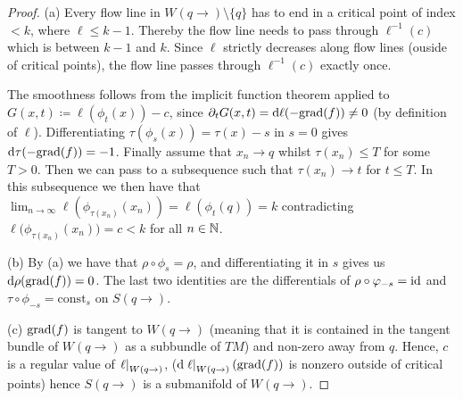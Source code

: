 \begin{proof}
(a) Every flow line in $W(q\to)\setminus \{q\}$ has to end in a critical point of index $<k$, where $\ell\leq k-1$. Thereby the flow line needs to pass through $\ell^{-1}(c)$ which is between $k-1$ and $k$. Since $\ell$ strictly decreases along flow lines (ouside of critical points), the flow line passes through $\ell^{-1}(c)$ exactly once.
 
The smoothness follows from the implicit function theorem applied to $G(x,t)\coloneq \ell(\phi_t(x))-c$, since $\partial_t G(x,t)=\mathop{}\!\mathrm{d} \ell (-\mathrm{grad}(f))\neq 0$ (by definition of $\ell$). Differentiating $\tau(\phi_s(x))=\tau(x)-s$ in $s=0$ gives $\mathop{}\!\mathrm{d} \tau (-\mathrm{grad}(f))=-1$. Finally assume that $x_n\to q$ whilst $\tau(x_n)\leq T$ for some $T>0$. Then we can pass to a subsequence such that $\tau(x_n)\to t$ for $t\leq T$. In this subsequence we then have that $\lim_{n\to \infty}\ell(\phi_{\tau(x_n)}(x_n))=\ell(\phi_t(q))=k$ contradicting $\ell\big(\phi_{\tau(x_n)}(x_n)\big)=c<k$ for all $n\in \mathbb{N}$. 

(b) By (a) we have that $\rho\circ \phi_s=\rho$, and differentiating it in $s$ gives us $\mathop{}\!\mathrm{d} \rho (\mathrm{grad}(f))=0$. The last two identities are the differentials of $\rho\circ \varphi_{-s}=\operatorname{\mathrm{id}}$ and $\tau \circ \phi_{-s} =\mathrm{const}_s$ on $S(q\to)$.

(c) $\mathrm{grad}(f)$ is tangent to $W(q\to)$ (meaning that it is contained in the tangent bundle of $W(q\to)$ as a subbundle of $TM$) and non-zero away from $q$. Hence, $c$ is a regular value of $\left.\ell\right|_{W(q\to)}$, ($\mathop{}\!\mathrm{d} \left.\ell\right|_{W(q\to)} (\mathrm{grad}(f))$ is nonzero outside of critical points) hence $S(q\to)$ is a submanifold of $W(q\to)$.


\end{proof}
